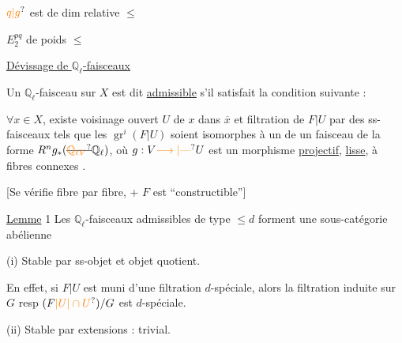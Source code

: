 $\unsure{q|g}$ est de dim relative $\leq$


 $E_2^{pq}$ de poids $\leq$


\uline{Dévissage de $\mathbb Q_\ell$-faisceaux}


Un $\mathbb Q_\ell$-faisceau   sur $X$ est dit \uline{admissible}  s'il satisfait la condition suivante :

$\forall x\in X$, existe voisinage ouvert $U$ de $x$ dans $\overline{x}$ et filtration  de $F|U$ par des ss-faisceaux  tels que les $\operatorname{gr}^i(F|U)$ soient isomorphes à un   de un faisceau de la forme $R^n g_*(\deleted{\unsure{\mathbb Q_{\ell V}}}\mathbb Q_\ell)$, où $g:V\unsure{\longrightarrow|\text{---}}U$ est un morphisme \uline{projectif},  \uline{lisse}, à fibres connexes .


[Se vérifie fibre par fibre, + $F$ est ``constructible'']

 

\uline{Lemme} 1 \quad Les  $\mathbb Q_\ell$-faisceaux admissibles de type $\leq d$ forment une sous-catégorie abélienne   

 (i) Stable par ss-objet et objet quotient.

En effet, si $F|U$ est muni d'une filtration $d$-spéciale,  alors la filtration induite sur $G$ resp $(F\unsure{\vert U|\cap U})/G$ est $d$-spéciale. 

(ii) Stable par extensions : trivial.

